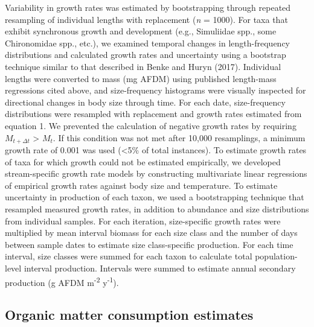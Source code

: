 \documentclass[
]{article}
\numberwithin{equation}
\begin{document}
Variability in growth rates was estimated by bootstrapping through
repeated resampling of individual lengths with replacement (\emph{n} =
1000). For taxa that exhibit synchronous growth and development (e.g.,
Simuliidae spp., some Chironomidae spp., etc.), we examined temporal
changes in length-frequency distributions and calculated growth rates
and uncertainty using a bootstrap technique similar to that described in
Benke and Huryn (2017). Individual lengths were converted to mass (mg
AFDM) using published length-mass regressions cited above, and
size-frequency histograms were visually inspected for directional
changes in body size through time. For each date, size-frequency
distributions were resampled with replacement and growth rates estimated
from equation 1. We prevented the calculation of negative growth rates
by requiring \(M_{t + \Delta t}\) \textgreater{} \(M_t\). If this
condition was not met after 10,000 resamplings, a minimum growth rate of
0.001 was used (\textless5\% of total instances). To estimate growth
rates of taxa for which growth could not be estimated empirically, we
developed stream-specific growth rate models by constructing
multivariate linear regressions of empirical growth rates against body
size and temperature. To estimate uncertainty in production of each
taxon, we used a bootstrapping technique that resampled measured growth
rates, in addition to abundance and size distributions from individual
samples. For each iteration, size-specific growth rates were multiplied
by mean interval biomass for each size class and the number of days
between sample dates to estimate size class-specific production. For
each time interval, size classes were summed for each taxon to calculate
total population-level interval production. Intervals were summed to
estimate annual secondary production (g AFDM m\textsuperscript{-2}
y\textsuperscript{-1}).

\hypertarget{organic-matter-consumption-estimates}{%
\subsection{Organic matter consumption
estimates}\label{organic-matter-consumption-estimates}}
\end{document}
